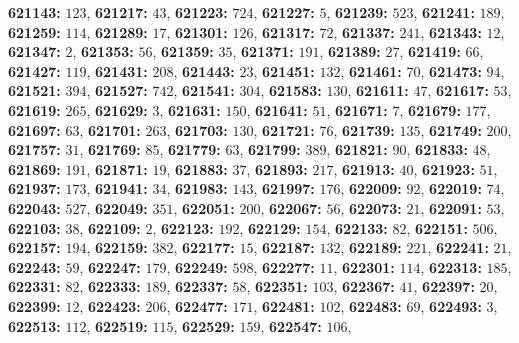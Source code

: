 \textsf{\bfseries 621143:} $123$, \textsf{\bfseries 621217:} $43$, \textsf{\bfseries 621223:} $724$, \textsf{\bfseries 621227:} $5$, \textsf{\bfseries 621239:} $523$, \textsf{\bfseries 621241:} $189$, \textsf{\bfseries 621259:} $114$, \textsf{\bfseries 621289:} $17$, \textsf{\bfseries 621301:} $126$, \textsf{\bfseries 621317:} $72$, \textsf{\bfseries 621337:} $241$, \textsf{\bfseries 621343:} $12$, \textsf{\bfseries 621347:} $2$, \textsf{\bfseries 621353:} $56$, \textsf{\bfseries 621359:} $35$, \textsf{\bfseries 621371:} $191$, \textsf{\bfseries 621389:} $27$, \textsf{\bfseries 621419:} $66$, \textsf{\bfseries 621427:} $119$, \textsf{\bfseries 621431:} $208$, \textsf{\bfseries 621443:} $23$, \textsf{\bfseries 621451:} $132$, \textsf{\bfseries 621461:} $70$, \textsf{\bfseries 621473:} $94$, \textsf{\bfseries 621521:} $394$, \textsf{\bfseries 621527:} $742$, \textsf{\bfseries 621541:} $304$, \textsf{\bfseries 621583:} $130$, \textsf{\bfseries 621611:} $47$, \textsf{\bfseries 621617:} $53$, \textsf{\bfseries 621619:} $265$, \textsf{\bfseries 621629:} $3$, \textsf{\bfseries 621631:} $150$, \textsf{\bfseries 621641:} $51$, \textsf{\bfseries 621671:} $7$, \textsf{\bfseries 621679:} $177$, \textsf{\bfseries 621697:} $63$, \textsf{\bfseries 621701:} $263$, \textsf{\bfseries 621703:} $130$, \textsf{\bfseries 621721:} $76$, \textsf{\bfseries 621739:} $135$, \textsf{\bfseries 621749:} $200$, \textsf{\bfseries 621757:} $31$, \textsf{\bfseries 621769:} $85$, \textsf{\bfseries 621779:} $63$, \textsf{\bfseries 621799:} $389$, \textsf{\bfseries 621821:} $90$, \textsf{\bfseries 621833:} $48$, \textsf{\bfseries 621869:} $191$, \textsf{\bfseries 621871:} $19$, \textsf{\bfseries 621883:} $37$, \textsf{\bfseries 621893:} $217$, \textsf{\bfseries 621913:} $40$, \textsf{\bfseries 621923:} $51$, \textsf{\bfseries 621937:} $173$, \textsf{\bfseries 621941:} $34$, \textsf{\bfseries 621983:} $143$, \textsf{\bfseries 621997:} $176$, \textsf{\bfseries 622009:} $92$, \textsf{\bfseries 622019:} $74$, \textsf{\bfseries 622043:} $527$, \textsf{\bfseries 622049:} $351$, \textsf{\bfseries 622051:} $200$, \textsf{\bfseries 622067:} $56$, \textsf{\bfseries 622073:} $21$, \textsf{\bfseries 622091:} $53$, \textsf{\bfseries 622103:} $38$, \textsf{\bfseries 622109:} $2$, \textsf{\bfseries 622123:} $192$, \textsf{\bfseries 622129:} $154$, \textsf{\bfseries 622133:} $82$, \textsf{\bfseries 622151:} $506$, \textsf{\bfseries 622157:} $194$, \textsf{\bfseries 622159:} $382$, \textsf{\bfseries 622177:} $15$, \textsf{\bfseries 622187:} $132$, \textsf{\bfseries 622189:} $221$, \textsf{\bfseries 622241:} $21$, \textsf{\bfseries 622243:} $59$, \textsf{\bfseries 622247:} $179$, \textsf{\bfseries 622249:} $598$, \textsf{\bfseries 622277:} $11$, \textsf{\bfseries 622301:} $114$, \textsf{\bfseries 622313:} $185$, \textsf{\bfseries 622331:} $82$, \textsf{\bfseries 622333:} $189$, \textsf{\bfseries 622337:} $58$, \textsf{\bfseries 622351:} $103$, \textsf{\bfseries 622367:} $41$, \textsf{\bfseries 622397:} $20$, \textsf{\bfseries 622399:} $12$, \textsf{\bfseries 622423:} $206$, \textsf{\bfseries 622477:} $171$, \textsf{\bfseries 622481:} $102$, \textsf{\bfseries 622483:} $69$, \textsf{\bfseries 622493:} $3$, \textsf{\bfseries 622513:} $112$, \textsf{\bfseries 622519:} $115$, \textsf{\bfseries 622529:} $159$, \textsf{\bfseries 622547:} $106$, 
